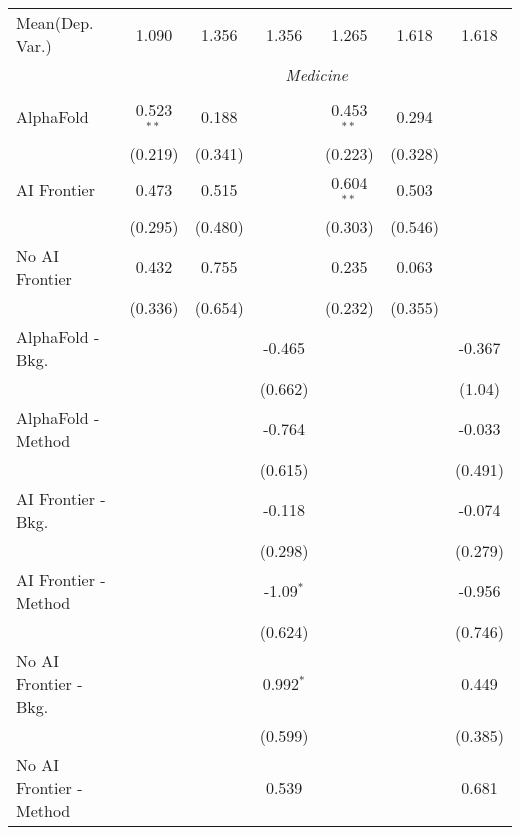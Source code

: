 \begin{tabular}{lcccccc}
Mean(Dep. Var.) & 1.090 & 1.356 & 1.356 & 1.265 & 1.618 & 1.618 \\
 & \multicolumn{6}{c}{\textit{Medicine}} \\ \\
   AlphaFold               & 0.523$^{**}$ & 0.188   &             & 0.453$^{**}$ & 0.294   &   \\   
                           & (0.219)      & (0.341) &             & (0.223)      & (0.328) &   \\   
   AI Frontier             & 0.473        & 0.515   &             & 0.604$^{**}$ & 0.503   &   \\   
                           & (0.295)      & (0.480) &             & (0.303)      & (0.546) &   \\   
   No AI Frontier          & 0.432        & 0.755   &             & 0.235        & 0.063   &   \\   
                           & (0.336)      & (0.654) &             & (0.232)      & (0.355) &   \\   
   AlphaFold - Bkg.        &              &         & -0.465      &              &         & -0.367\\   
                           &              &         & (0.662)     &              &         & (1.04)\\   
   AlphaFold - Method      &              &         & -0.764      &              &         & -0.033\\   
                           &              &         & (0.615)     &              &         & (0.491)\\   
   AI Frontier - Bkg.      &              &         & -0.118      &              &         & -0.074\\   
                           &              &         & (0.298)     &              &         & (0.279)\\   
   AI Frontier - Method    &              &         & -1.09$^{*}$ &              &         & -0.956\\   
                           &              &         & (0.624)     &              &         & (0.746)\\   
   No AI Frontier - Bkg.   &              &         & 0.992$^{*}$ &              &         & 0.449\\   
                           &              &         & (0.599)     &              &         & (0.385)\\   
   No AI Frontier - Method &              &         & 0.539       &              &         & 0.681\\   

\end{tabular}
